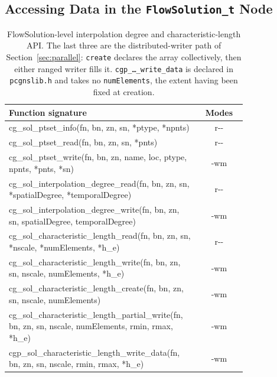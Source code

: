 \documentclass[11pt,letterpaper]{article}
\newif\ifvfourdraft
\newcommand{\vfour}[1]{\ifvfourdraft\textcolor{v4violet}{#1}\else#1\fi}
\begin{document}
\subsection{Accessing Data in the \texttt{FlowSolution\_t} Node}
\label{sec:sol-api}

\begin{table}[htbp]
\centering
\small
{}
\begin{tabular}{@{} >{\raggedright\ttfamily\footnotesize}p{0.80\linewidth} c @{}}
\toprule
\textbf{\normalfont Function signature} & \textbf{\normalfont Modes} \\
\midrule
cg\_sol\_ptset\_info(fn, bn, zn, sn, *ptype, *npnts) & r{-}{-} \\
cg\_sol\_ptset\_read(fn, bn, zn, sn, *pnts) & r{-}{-} \\
cg\_sol\_ptset\_write(fn, bn, zn, name, loc, ptype, npnts, *pnts, *sn) & {-}wm \\
\addlinespace
cg\_sol\_interpolation\_degree\_read(fn, bn, zn, sn, *spatialDegree, *temporalDegree) & r{-}{-} \\
cg\_sol\_interpolation\_degree\_write(fn, bn, zn, sn, spatialDegree, temporalDegree) & {-}wm \\
\addlinespace
cg\_sol\_characteristic\_length\_read(fn, bn, zn, sn, *nscale, *numElements, *h\_e) & r{-}{-} \\
cg\_sol\_characteristic\_length\_write(fn, bn, zn, sn, nscale, numElements, *h\_e) & {-}wm \\
\vfour{cg\_sol\_characteristic\_length\_create(fn, bn, zn, sn, nscale, numElements)} & \vfour{{-}wm} \\
\vfour{cg\_sol\_characteristic\_length\_partial\_write(fn, bn, zn, sn, nscale, numElements, rmin, rmax, *h\_e)} & \vfour{{-}wm} \\
\vfour{cgp\_sol\_characteristic\_length\_write\_data(fn, bn, zn, sn, nscale, rmin, rmax, *h\_e)} & \vfour{{-}wm} \\
\bottomrule
\end{tabular}
\caption{FlowSolution-level interpolation degree and characteristic-length API.
\vfour{The last three are the distributed-writer path of
Section~\ref{sec:parallel}: \texttt{create} declares the array collectively,
then either ranged writer fills it.  \texttt{cgp\_\ldots\_write\_data} is
declared in \texttt{pcgnslib.h} and takes no \texttt{numElements}, the extent
having been fixed at creation.}}
\label{tab:sol-api}
\end{table}
\end{document}
